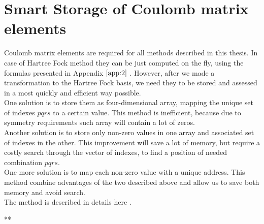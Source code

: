 \documentclass[twoside,english]{uiofysmaster}
\theoremstyle{definition}
\begin{document}
\section{Smart Storage of Coulomb matrix elements}
Coulomb matrix elements are required for all methods described in this thesis. In case of Hartree Fock method they can be just computed on the fly, using the formulas presented in Appendix $\ref{app:2}$ . However, after we made a transformation to the Hartree Fock basis, we need they to be stored and assessed in a most quickly and efficient way possible. \\
One solution is to store them as four-dimensional array, mapping the unique set of indexes $pqrs$ to a certain value. This method is inefficient, because due to symmetry requirements such array will contain a lot of zeros.\\
Another solution is to store only non-zero values in one array and associated set of indexes  in the other. This improvement will save a lot of memory, but require a costly search through the vector of indexes, to find a position of needed combination $pqrs$.\\
One more solution is to map each non-zero value with a unique address. This method combine advantages of the two described above and allow us to save both memory and avoid search.\\
The method is described in details here \cite{leikangerFullConfigurationInteraction}.

\clearpage
\newpage
**\appendix
\end{document}
